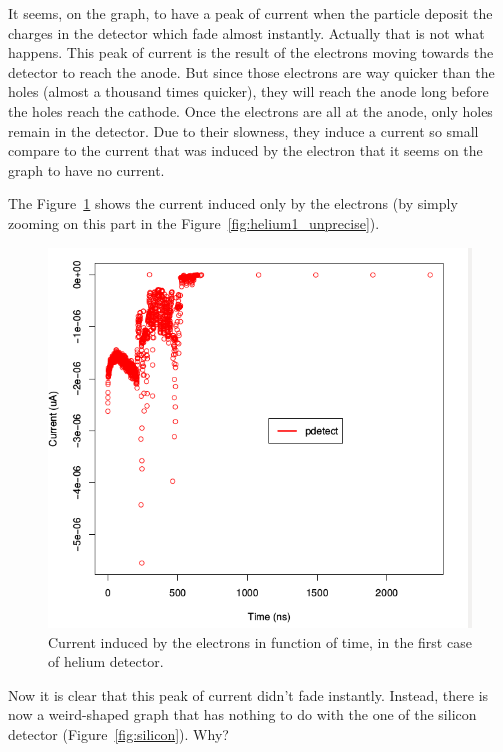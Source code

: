 \documentclass[11pt]{article}
\begin{document}
				It seems, on the graph, to have a peak of current when the particle deposit the charges in the
				detector which fade almost instantly. Actually that is not what happens. This peak of current
				is the result of the electrons moving towards the detector to reach the anode. But since those
				electrons are way quicker than the holes (almost a thousand times quicker), they will reach the
				anode long before the holes reach the cathode. Once the electrons are all at the anode, only holes
				remain in the detector. Due to their slowness, they induce a current so small compare to the
				current that was induced by the electron that it seems on the graph to have no current.

				The Figure~\ref{fig:helium1_precise} shows the current induced only by the electrons (by simply zooming
				on this part in the Figure~\ref{fig:helium1_unprecise}).

				\begin{figure}[H]
				  \center
				  \includegraphics[scale=0.5]{images/applications/helium1_precise.png}
				  \caption{Current induced by the electrons in function of time, in the first case of helium detector.}
				  \label{fig:helium1_precise}
				\end{figure}

				Now it is clear that this peak of current didn't fade instantly. Instead, there is now a weird-shaped
				graph that has nothing to do with the one of the silicon detector (Figure~\ref{fig:silicon}). Why?
\end{document}
